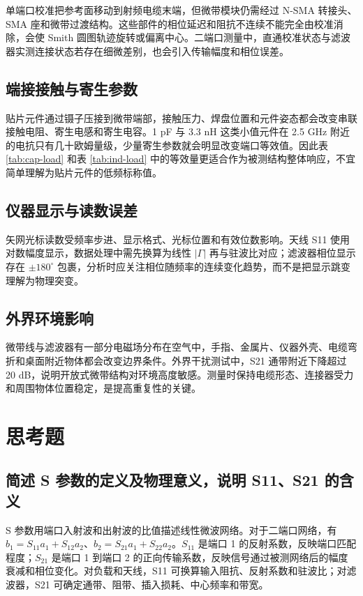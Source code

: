 \documentclass{ctexart}
\begin{document}
单端口校准把参考面移动到射频电缆末端，但微带模块仍需经过 N-SMA 转接头、SMA 座和微带过渡结构。这些部件的相位延迟和阻抗不连续不能完全由校准消除，会使 Smith 圆图轨迹旋转或偏离中心。二端口测量中，直通校准状态与滤波器实测连接状态若存在细微差别，也会引入传输幅度和相位误差。

\subsection{端接接触与寄生参数}

贴片元件通过镊子压接到微带端部，接触压力、焊盘位置和元件姿态都会改变串联接触电阻、寄生电感和寄生电容。1 pF 与 3.3 nH 这类小值元件在 2.5 GHz 附近的电抗只有几十欧姆量级，少量寄生参数就会明显改变端口等效值。因此表 \ref{tab:cap-load} 和表 \ref{tab:ind-load} 中的等效量更适合作为被测结构整体响应，不宜简单理解为贴片元件的低频标称值。

\subsection{仪器显示与读数误差}

矢网光标读数受频率步进、显示格式、光标位置和有效位数影响。天线 S11 使用对数幅度显示，数据处理中需先换算为线性 $|\Gamma|$ 再与驻波比对应；滤波器相位显示存在 $\pm180^\circ$ 包裹，分析时应关注相位随频率的连续变化趋势，而不是把显示跳变理解为物理突变。

\subsection{外界环境影响}

微带线与滤波器有一部分电磁场分布在空气中，手指、金属片、仪器外壳、电缆弯折和桌面附近物体都会改变边界条件。外界干扰测试中，S21 通带附近下降超过 20 dB，说明开放式微带结构对环境高度敏感。测量时保持电缆形态、连接器受力和周围物体位置稳定，是提高重复性的关键。

\section{思考题}

\subsection{简述 S 参数的定义及物理意义，说明 S11、S21 的含义}

S 参数用端口入射波和出射波的比值描述线性微波网络。对于二端口网络，有 $b_1=S_{11}a_1+S_{12}a_2$、$b_2=S_{21}a_1+S_{22}a_2$。$S_{11}$ 是端口 1 的反射系数，反映端口匹配程度；$S_{21}$ 是端口 1 到端口 2 的正向传输系数，反映信号通过被测网络后的幅度衰减和相位变化。对负载和天线，S11 可换算输入阻抗、反射系数和驻波比；对滤波器，S21 可确定通带、阻带、插入损耗、中心频率和带宽。
\end{document}
